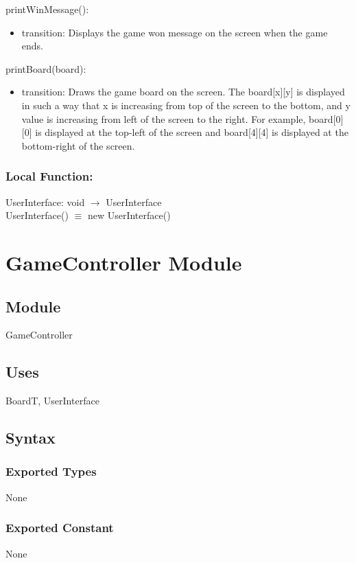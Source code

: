 \documentclass[12pt]{article}
\begin{document}
\noindent printWinMessage():
\begin{itemize}
    \item transition: Displays the game won message on the screen when the game ends.
\end{itemize}

\noindent printBoard(board):
\begin{itemize}
    \item transition: Draws the game board on the screen. The board[x][y] is displayed in such a way that x is increasing from top of the screen to the bottom, and y value is increasing from left of the screen to the right. For example, board[0][0] is displayed at the top-left of the screen and board[4][4] is displayed at the bottom-right of the screen.
\end{itemize}

\subsubsection*{Local Function:}

UserInterface: void $\rightarrow$ UserInterface \\
UserInterface() $\equiv$ new UserInterface()

\newpage

\section* {GameController Module}

\subsection*{Module}
GameController

\subsection* {Uses}
BoardT, UserInterface
\subsection* {Syntax}
\subsubsection* {Exported Types}
None
\subsubsection* {Exported Constant}
None
\end{document}
